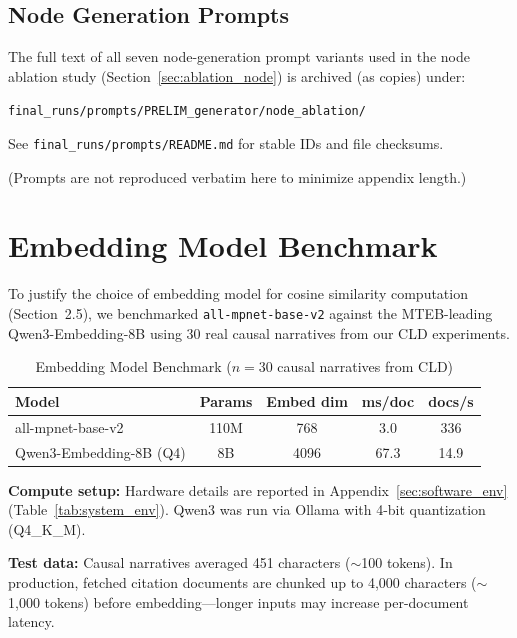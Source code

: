 \section{Node Generation Prompts}
\label{sec:node_prompts}

The full text of all seven node-generation prompt variants used in the node ablation study (Section~\ref{sec:ablation_node}) is archived (as copies) under:

\noindent\texttt{final\_runs/prompts/PRELIM\_generator/node\_ablation/}

\noindent See \texttt{final\_runs/prompts/README.md} for stable IDs and file checksums.

\noindent (Prompts are not reproduced verbatim here to minimize appendix length.)

\chapter{Embedding Model Benchmark}
\label{sec:embedding_benchmark}

To justify the choice of embedding model for cosine similarity computation (Section~2.5), we benchmarked \texttt{all-mpnet-base-v2} against the MTEB-leading Qwen3-Embedding-8B using 30 real causal narratives from our CLD experiments.

\begin{table}[H]
\centering
\caption{Embedding Model Benchmark ($n=30$ causal narratives from CLD)}
\label{tab:embed_benchmark}
\footnotesize
\begin{tabular}{@{}lcccc@{}}
\toprule
\textbf{Model} & \textbf{Params} & \textbf{Embed dim} & \textbf{ms/doc} & \textbf{docs/s} \\
\midrule
all-mpnet-base-v2 & 110M & 768 & 3.0 & 336 \\
Qwen3-Embedding-8B (Q4) & 8B & 4096 & 67.3 & 14.9 \\
\bottomrule
\end{tabular}
\end{table}

\textbf{Compute setup:} Hardware details are reported in Appendix~\ref{sec:software_env} (Table~\ref{tab:system_env}). Qwen3 was run via Ollama with 4-bit quantization (Q4\_K\_M).

\textbf{Test data:} Causal narratives averaged 451 characters ($\sim$100 tokens). In production, fetched citation documents are chunked up to 4,000 characters ($\sim$1,000 tokens) before embedding---longer inputs may increase per-document latency.

